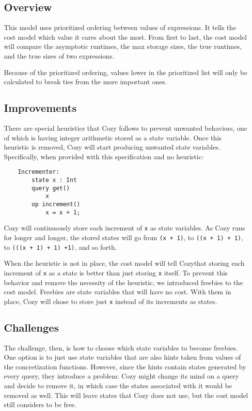\newcommand{\code}[1]{\texttt{#1}}

\subsection{Overview}
This model uses prioritized ordering between values of expressions. It tells the
cost model which value it cares about the most. From first to last, the cost
model will compare the asymptotic runtimes, the max storage sizes, the true
runtimes, and the true sizes of two expressions.

Because of the prioritized ordering, values lower in the prioritized list will
only be calculated to break ties from the more important ones.

\subsection{Improvements}
There are special heuristics that Cozy follows to prevent unwanted behaviors,
one of which is having integer arithmetic stored as a state variable. Once this
heuristic is removed, Cozy will start producing unwanted state variables.
Specifically, when provided with this specification and no heuristic:

\begin{center}
\begin{lstlisting}
    Incrementer:
        state x : Int
        query get()
            x
        op increment()
            x = x + 1;
\end{lstlisting}
\end{center}

Cozy will continuously store each increment of \code{x} as state variables. As
Cozy runs for longer and longer, the stored states will go from \code{(x + 1)},
to \code{((x + 1) + 1)}, to \code{(((x + 1) + 1) +1)}, and so forth.

When the heuristic is not in place, the cost model will tell Cozythat storing
each increment of \code{x} as a state is better than just storing \code{x}
itself. To prevent this behavior and remove the necessity of the heuristic, we
introduced freebies to the cost model. Freebies are state variables that will
have no cost. With them in place, Cozy will chose to store just \code{x} instead
of its increments as states.

\subsection{Challenges}
The challenge, then, is how to choose which state variables to become freebies.
One option is to just use state variables that are also hints taken from values
of the concretization functions. However, since the hints contain states
generated by every query, they introduce a problem: Cozy might change its mind
on a query and decide to remove it, in which case the states associated with it
would be removed as well. This will leave states that Cozy does not use, but the
cost model still considers to be free.

